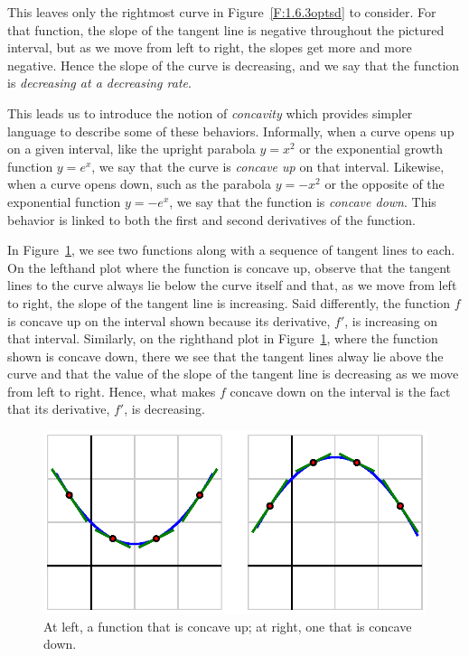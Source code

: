 This leaves only the rightmost curve in Figure~\ref{F:1.6.3optsd} to consider.  For that function, the slope of the tangent line is negative throughout the pictured interval, but as we move from left to right, the slopes get more and more negative.  Hence the slope of the curve is decreasing, and we say that the function is \emph{decreasing at a decreasing rate}.

This leads us to introduce the notion of \emph{concavity}  which provides simpler language to describe some of these behaviors.  Informally, when a curve opens up on a given interval, like the upright parabola $y = x^2$ or the exponential growth function $y = e^x$, we say that the curve is \emph{concave up} on that interval.  Likewise, when a curve opens down, such as the parabola $y = -x^2$ or the opposite of the exponential function $y = -e^{x}$, we say that the function is \emph{concave down}.  This behavior is linked to both the first and second derivatives of the function.  

In Figure~\ref{F:1.6.concavity}, we see two functions along with a sequence of tangent lines to each.  On the lefthand plot where the function is concave up, observe that the tangent lines to the curve always lie below the curve itself and that, as we move from left to right, the slope of the tangent line is increasing.  Said differently, the function $f$ is concave up on the interval shown because its derivative, $f'$, is increasing on that interval.  Similarly, on the righthand plot in Figure~\ref{F:1.6.concavity}, where the function shown is concave down, there we see that the tangent lines alway lie above the curve and that the value of the slope of the tangent line is decreasing as we move from left to right.  Hence, what makes $f$ concave down on the interval is the fact that its derivative, $f'$, is decreasing.

\begin{figure}[ht]
\begin{center}
\includegraphics{figures/1_6_concavity.eps}
\caption{At left, a function that is concave up; at right, one that is concave down.} \label{F:1.6.concavity}
\end{center}
\end{figure}

